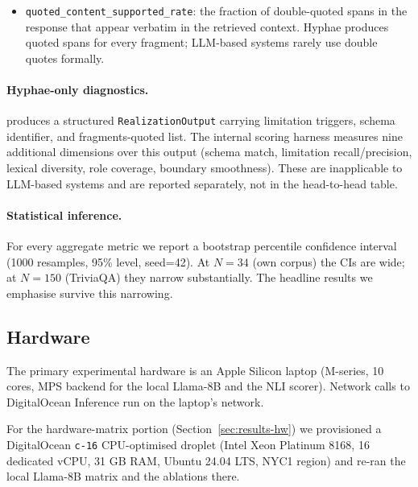 \begin{itemize}
    \item \texttt{quoted\_content\_supported\_rate}: the fraction
    of double-quoted spans in the response that appear verbatim
    in the retrieved context. Hyphae produces quoted spans for
    every fragment; LLM-based systems rarely use double quotes
    formally.
\end{itemize}

\paragraph{Hyphae-only diagnostics.}

\hyphae{} produces a structured \texttt{RealizationOutput}
carrying limitation triggers, schema identifier, and
fragments-quoted list. The internal scoring harness measures
nine additional dimensions over this output (schema match,
limitation recall/precision, lexical diversity, role coverage,
boundary smoothness). These are inapplicable to LLM-based
systems and are reported separately, not in the head-to-head
table.

\paragraph{Statistical inference.}

For every aggregate metric we report a bootstrap percentile
confidence interval (1000 resamples, 95\% level, seed=42). At
$N=34$ (own corpus) the CIs are wide; at $N=150$ (TriviaQA) they
narrow substantially. The headline results we emphasise survive
this narrowing.

\subsection{Hardware}
\label{sec:hardware}

The primary experimental hardware is an Apple Silicon laptop
(M-series, 10 cores, MPS backend for the local Llama-8B and the
NLI scorer). Network calls to DigitalOcean Inference run on
the laptop's network.

For the hardware-matrix portion (Section~\ref{sec:results-hw})
we provisioned a DigitalOcean \texttt{c-16} CPU-optimised
droplet (Intel Xeon Platinum 8168, 16 dedicated vCPU, 31 GB
RAM, Ubuntu 24.04 LTS, NYC1 region) and re-ran the local Llama-8B
matrix and the \hyphae{} ablations there.

